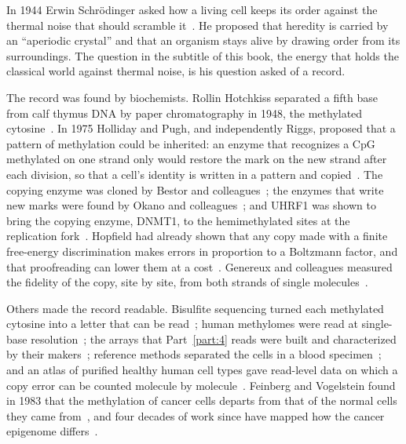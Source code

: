 In 1944 Erwin Schr\"odinger asked how a living cell keeps its order against the thermal noise that should scramble it~\cite{SchrodingerWhatIsLife}.
He proposed that heredity is carried by an ``aperiodic crystal'' and that an organism stays alive by drawing order from its surroundings.
\conjecture{} The question in the subtitle of this book, the energy that holds the classical world against thermal noise, is his question asked
of a record. \interp

The record was found by biochemists. Rollin Hotchkiss separated a fifth base from calf thymus DNA by paper chromatography in 1948, the
methylated cytosine~\cite{Hotchkiss1948}. \observed{} In 1975 Holliday and Pugh, and independently Riggs, proposed that a pattern of
methylation could be inherited: an enzyme that recognizes a CpG methylated on one strand only would restore the mark on the new strand after
each division, so that a cell's identity is written in a pattern and copied~\cite{HollidayPugh1975,Riggs1975}. The copying enzyme was cloned
by Bestor and colleagues~\cite{Bestor1988}; the enzymes that write new marks were found by Okano and colleagues~\cite{Okano1999}; and UHRF1
was shown to bring the copying enzyme, DNMT1, to the hemimethylated sites at the replication fork~\cite{Bostick2007,Sharif2007}. \observed{}
Hopfield had already shown that any copy made with a finite free-energy discrimination makes errors in proportion to a Boltzmann factor, and
that proofreading can lower them at a cost~\cite{Hopfield1974}. \derived{} Genereux and colleagues measured the fidelity of the copy, site by
site, from both strands of single molecules~\cite{Genereux2005}. \observed

Others made the record readable. Bisulfite sequencing turned each methylated cytosine into a letter that can be read~\cite{Frommer1992};
human methylomes were read at single-base resolution~\cite{Lister2009}; the arrays that Part~\ref{part:4} reads were built and characterized
by their makers~\cite{Bibikova2011,Pidsley2016}; reference methods separated the cells in a blood specimen~\cite{Houseman2012,Salas2018}; and
an atlas of purified healthy human cell types gave read-level data on which a copy error can be counted molecule by
molecule~\cite{Loyfer2023}. \observed{} Feinberg and Vogelstein found in 1983 that the methylation of cancer cells departs from that of the
normal cells they came from~\cite{FeinbergVogelstein1983}, and four decades of work since have mapped how the cancer epigenome
differs~\cite{Baylin2011}. \observed


